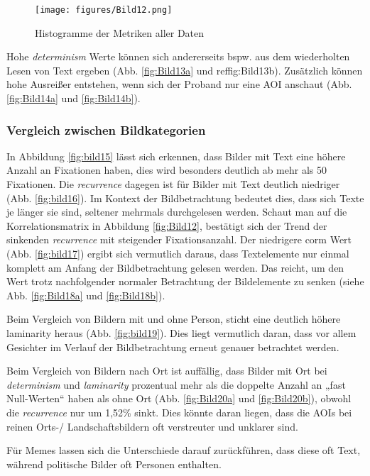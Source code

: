 \documentclass[
    language=german, %
    thesis=seminar, %
    supervisor=postdoc, %
    multiauthor=true, %
    ]{settings/csssa-thesis}
\begin{document}
\begin{figure}[ht]
    \centering
    \texttt{[image: figures/Bild12.png]}
    \caption{Histogramme der Metriken aller Daten}\label{fig:Bild11}
\end{figure}

Hohe \textit{determinism} Werte können sich andererseits bspw. 
aus dem wiederholten Lesen von Text ergeben (Abb. \ref{fig:Bild13a} und ref{fig:Bild13b}). 
Zusätzlich können hohe Ausreißer entstehen, wenn sich der Proband nur eine AOI anschaut (Abb. \ref{fig:Bild14a} und \ref{fig:Bild14b}). 

\subsubsection{Vergleich zwischen Bildkategorien}
In Abbildung \ref{fig:bild15} lässt sich erkennen, dass Bilder mit Text eine höhere Anzahl an Fixationen haben, 
dies wird besonders deutlich ab mehr als 50 Fixationen. 
Die \textit{recurrence} dagegen ist für Bilder mit Text deutlich niedriger (Abb. \ref{fig:bild16}). 
Im Kontext der Bildbetrachtung bedeutet dies, dass sich Texte je länger sie sind, 
seltener mehrmals durchgelesen werden.  Schaut man auf die Korrelationsmatrix in Abbildung \ref{fig:Bild12}, 
bestätigt sich der Trend der sinkenden \textit{recurrence} mit steigender Fixationsanzahl. 
Der niedrigere corm Wert (Abb. \ref{fig:bild17}) ergibt sich vermutlich daraus, dass Textelemente 
nur einmal komplett am Anfang der Bildbetrachtung gelesen werden. Das reicht, 
um den Wert trotz nachfolgender normaler Betrachtung der Bildelemente zu senken (siehe Abb. \ref{fig:Bild18a} und \ref{fig:Bild18b}). 

Beim Vergleich von Bildern mit und ohne Person, sticht eine deutlich höhere laminarity heraus (Abb. \ref{fig:bild19}). 
Dies liegt vermutlich daran, dass vor allem Gesichter im Verlauf der Bildbetrachtung erneut genauer betrachtet werden. 

Beim Vergleich von Bildern nach Ort ist auffällig, dass Bilder mit Ort bei \textit{determinism} und \textit{laminarity} 
prozentual mehr als die doppelte Anzahl an „fast Null-Werten“ haben als ohne Ort (Abb. \ref{fig:Bild20a} und \ref{fig:Bild20b}), 
obwohl die \textit{recurrence} nur um 1,52\% sinkt. Dies könnte daran liegen, dass die AOIs bei reinen 
Orts-/ Landschaftsbildern oft verstreuter und unklarer sind. 

Für Memes lassen sich die Unterschiede darauf zurückführen, dass diese oft Text, während politische Bilder oft Personen enthalten.  
\end{document}
